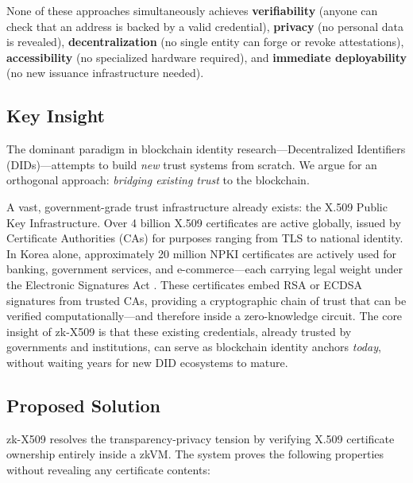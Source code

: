 \documentclass[11pt, a4paper]{article}
\begin{document}
None of these approaches simultaneously achieves \textbf{verifiability}
(anyone can check that an address is backed by a valid credential),
\textbf{privacy} (no personal data is revealed),
\textbf{decentralization} (no single entity can forge or revoke
attestations), \textbf{accessibility} (no specialized hardware
required), and \textbf{immediate deployability} (no new issuance
infrastructure needed).

\subsection{Key Insight}\label{key-insight}

The dominant paradigm in blockchain identity research---Decentralized
Identifiers (DIDs)---attempts to build \emph{new} trust systems from
scratch. We argue for an orthogonal approach: \emph{bridging existing
trust} to the blockchain.

A vast, government-grade trust infrastructure already exists: the X.509
Public Key Infrastructure. Over 4 billion X.509 certificates are active
globally, issued by Certificate Authorities (CAs) for purposes ranging
from TLS to national identity. In Korea alone, approximately 20 million
NPKI certificates are actively used for banking, government services,
and e-commerce---each carrying legal weight under the Electronic
Signatures Act \cite{ref27}. These certificates embed RSA or ECDSA
signatures from trusted CAs, providing a cryptographic chain of trust
that can be verified computationally---and therefore inside a
zero-knowledge circuit. The core insight of zk-X509 is that these
existing credentials, already trusted by governments and institutions,
can serve as blockchain identity anchors \emph{today}, without waiting
years for new DID ecosystems to mature.

\subsection{Proposed Solution}\label{proposed-solution}

zk-X509 resolves the transparency-privacy tension by verifying X.509
certificate ownership entirely inside a zkVM. The system proves the
following properties without revealing any certificate contents:
\end{document}
